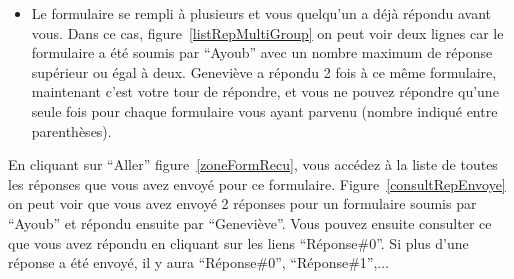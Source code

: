 \documentclass[a4paper,11pt,final]{report}
\begin{document}
\begin{itemize}
	\item Le formulaire se rempli à plusieurs et vous quelqu'un a déjà répondu avant vous. Dans ce cas, figure~\ref{listRepMultiGroup} on peut voir deux lignes car le formulaire a été soumis par ``Ayoub'' avec un nombre maximum de réponse supérieur ou égal à deux. Geneviève a répondu 2 fois à ce même formulaire, maintenant c'est votre tour de répondre, et vous ne pouvez répondre qu'une seule fois pour chaque formulaire vous ayant parvenu (nombre indiqué entre parenthèses).
	
	\noindent\begin{minipage}{\linewidth}%
\label{listRepMultiGroup}
\end{minipage}
\end{itemize}

En cliquant sur ``Aller'' figure~\ref{zoneFormRecu}, vous accédez à la liste de toutes les réponses que vous avez envoyé pour ce formulaire. Figure~\ref{consultRepEnvoye} on peut voir que vous avez envoyé 2 réponses pour un formulaire soumis par ``Ayoub'' et répondu ensuite par ``Geneviève''. Vous pouvez ensuite consulter ce que vous avez répondu en cliquant sur les liens ``Réponse\#0''. Si plus d'une réponse a été envoyé, il y aura ``Réponse\#0'', ``Réponse\#1'',...

\noindent\begin{minipage}{\linewidth}%
\label{consultRepEnvoye}
\end{minipage}
\end{document}

